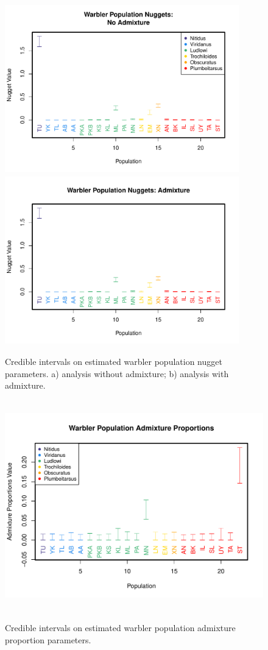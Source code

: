 \documentclass[12pt]{article}
\begin{document}
\begin{figure}
\centering
	\subcaptionbox{\label{warb_pop_noad_nugg}}
		{\includegraphics[width=4in,height=2.89in]{figs/warblers/warb_pop_NoAd_nugget.pdf}}
	\subcaptionbox{\label{warb_pop_ad_nugg}}
			{\includegraphics[width=4in,height=2.89in]{figs/warblers/warb_pop_Ad_nugget.pdf}}
	\caption{Credible intervals on estimated warbler population nugget parameters. a) analysis without admixture; b) analysis with admixture.}\label{sfig:warb_pop_nugg}
\end{figure}

\begin{figure}
\centering
	{\includegraphics[width=5in,height=3.6in]{figs/warblers/warb_pop_adprop.pdf}}
	\caption{Credible intervals on estimated warbler population admixture proportion parameters.}\label{sfig:warb_pop_adprop}
\end{figure}
\end{document}
